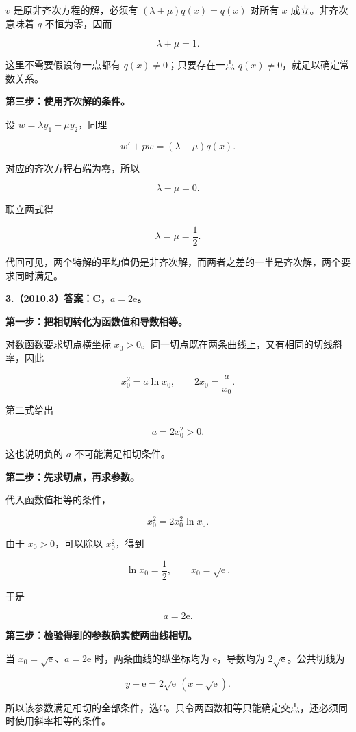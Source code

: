 \documentclass[UTF8,11pt,fontset=windows]{ctexart}
\begin{document}
$v$ 是原非齐次方程的解，必须有 $(\lambda+\mu)q(x)=q(x)$ 对所有 $x$ 成立。非齐次意味着 $q$ 不恒为零，因而

$$
\lambda+\mu=1.
$$

这里不需要假设每一点都有 $q(x)\ne0$；只要存在一点 $q(x)\ne0$，就足以确定常数关系。

\textbf{第三步：使用齐次解的条件。}

设 $w=\lambda y_1-\mu y_2$，同理

$$
w'+pw=(\lambda-\mu)q(x).
$$

对应的齐次方程右端为零，所以

$$
\lambda-\mu=0.
$$

联立两式得

$$
\boxed{\lambda=\mu=\frac12}.
$$

代回可见，两个特解的平均值仍是非齐次解，而两者之差的一半是齐次解，两个要求同时满足。

\clearpage

\textbf{3.（2010.3）答案：C，$a=2\mathrm e$。}

\textbf{第一步：把相切转化为函数值和导数相等。}

对数函数要求切点横坐标 $x_0>0$。同一切点既在两条曲线上，又有相同的切线斜率，因此

$$
x_0^2=a\ln x_0,
\qquad 2x_0=\frac a{x_0}.
$$

第二式给出

$$
a=2x_0^2>0.
$$

这也说明负的 $a$ 不可能满足相切条件。

\textbf{第二步：先求切点，再求参数。}

代入函数值相等的条件，

$$
x_0^2=2x_0^2\ln x_0.
$$

由于 $x_0>0$，可以除以 $x_0^2$，得到

$$
\ln x_0=\frac12,
\qquad x_0=\sqrt{\mathrm e}.
$$

于是

$$
\boxed{a=2\mathrm e}.
$$

\textbf{第三步：检验得到的参数确实使两曲线相切。}

当 $x_0=\sqrt{\mathrm e}$、$a=2\mathrm e$ 时，两条曲线的纵坐标均为 $\mathrm e$，导数均为 $2\sqrt{\mathrm e}$。公共切线为

$$
y-\mathrm e=2\sqrt{\mathrm e}\,(x-\sqrt{\mathrm e}).
$$

所以该参数满足相切的全部条件，选C。只令两函数相等只能确定交点，还必须同时使用斜率相等的条件。
\end{document}
